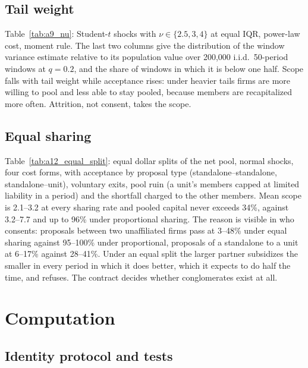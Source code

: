 

\subsection{Tail weight}\label{app:nu}

Table~\ref{tab:a9_nu}: Student-$t$ shocks with $\nu \in \{2.5, 3, 4\}$ at equal IQR, power-law cost, moment rule. The last two columns give the distribution of the window variance estimate relative to its population value over 200,000 i.i.d.\ 50-period windows at $q = 0.2$, and the share of windows in which it is below one half. Scope falls with tail weight while acceptance rises: under heavier tails firms are more willing to pool and less able to stay pooled, because members are recapitalized more often. Attrition, not consent, takes the scope.



\subsection{Equal sharing}\label{app:equalsplit}

Table~\ref{tab:a12_equal_split}: equal dollar splits of the net pool, normal shocks, four cost forms, with acceptance by proposal type (standalone--standalone, standalone--unit), voluntary exits, pool ruin (a unit's members capped at limited liability in a period) and the shortfall charged to the other members. Mean scope is 2.1--3.2 at every sharing rate and pooled capital never exceeds 34\%, against 3.2--7.7 and up to 96\% under proportional sharing. The reason is visible in who consents: proposals between two unaffiliated firms pass at 3--48\% under equal sharing against 95--100\% under proportional, proposals of a standalone to a unit at 6--17\% against 28--41\%. Under an equal split the larger partner subsidizes the smaller in every period in which it does better, which it expects to do half the time, and refuses. The contract decides whether conglomerates exist at all.



\section{Computation}\label{app:computation}

\subsection{Identity protocol and tests}\label{app:identity}

